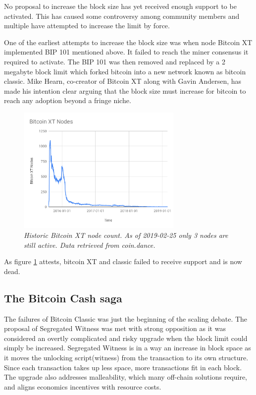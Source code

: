 No proposal to increase the block size has yet received enough support to be activated. This has caused some controversy among community members and multiple have attempted to increase the limit by force. 

One of the earliest attempts to increase the block size was when node Bitcoin XT implemented BIP 101 mentioned above. It failed to reach the miner consensus it required to activate. The BIP 101 was then removed and replaced by a 2 megabyte block limit which forked bitcoin into a new network known as bitcoin classic. Mike Hearn, co-creator of Bitcoin XT along with Gavin Andersen, has made his intention clear arguing that the block size must increase for bitcoin to reach any adoption beyond a fringe niche\cite{hearn:classic}. 

\begin{figure}[!htb]
	\hspace*{-0.7cm} 
	\centering
	\includegraphics[width=8cm]{external/Bitcoin_XT_Nodes.png}
	\caption{\textit{Historic Bitcoin XT node count. As of 2019-02-25 only 3 nodes are still active. Data retrieved from coin.dance\cite{coin:dance}.}}
	\label{fig:xt_nodes}
	\hspace*{2mm} 	
\end{figure}

As figure \ref{fig:xt_nodes} attests, bitcoin XT and classic failed to receive support and is now dead. 

\subsection{The Bitcoin Cash saga}

The failures of Bitcoin Classic was just the beginning of the scaling debate. The proposal of Segregated Witness\cite{bip:0141:segwit} was met with strong opposition as it was considered an overtly complicated and risky upgrade when the block limit could simply be increased. Segregated Witness is in a way an increase in block space as it moves the unlocking script(witness) from the transaction to its own structure. Since each transaction takes up less space, more transactions fit in each block. The upgrade also addresses malleability, which many off-chain solutions require, and aligns economics incentives with resource costs\cite{antonopoulos:segregated:witness:align:economic:incentives}.

